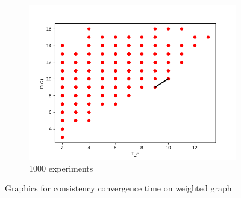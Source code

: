 \documentclass{llncs}
\begin{document}
\begin{figure}[p]
\begin{subfigure}{0.3\linewidth}
\centering\includegraphics[width=\linewidth]{images/1000-consistency-convergence-weighted.png}
\caption{1000 experiments}\label{pic:1000-w}
\end{subfigure}
\caption{Graphics for consistency convergence time on weighted graph}
\end{figure}
%
\end{document}
